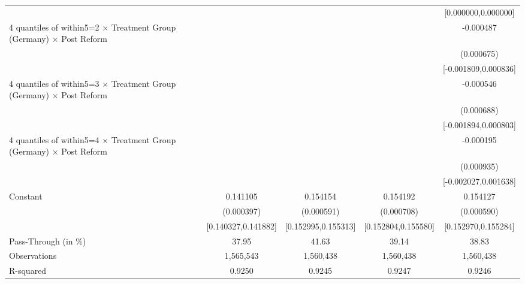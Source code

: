 {\begin{tabular}{l*{4}{c}}
                    &                     &                     &                     &[0.000000,0.000000]         \\
4 quantiles of within5=2 $\times$ Treatment Group (Germany) $\times$ Post Reform&                     &                     &                     &   -0.000487         \\
                    &                     &                     &                     &  (0.000675)         \\
                    &                     &                     &                     &[-0.001809,0.000836]         \\
4 quantiles of within5=3 $\times$ Treatment Group (Germany) $\times$ Post Reform&                     &                     &                     &   -0.000546         \\
                    &                     &                     &                     &  (0.000688)         \\
                    &                     &                     &                     &[-0.001894,0.000803]         \\
4 quantiles of within5=4 $\times$ Treatment Group (Germany) $\times$ Post Reform&                     &                     &                     &   -0.000195         \\
                    &                     &                     &                     &  (0.000935)         \\
                    &                     &                     &                     &[-0.002027,0.001638]         \\
Constant            &    0.141105\sym{***}&    0.154154\sym{***}&    0.154192\sym{***}&    0.154127\sym{***}\\
                    &  (0.000397)         &  (0.000591)         &  (0.000708)         &  (0.000590)         \\
                    &[0.140327,0.141882]         &[0.152995,0.155313]         &[0.152804,0.155580]         &[0.152970,0.155284]         \\
\midrule
Pass-Through (in \%)&       37.95         &       41.63         &       39.14         &       38.83         \\
Observations        &   1,565,543         &   1,560,438         &   1,560,438         &   1,560,438         \\
R-squared           &      0.9250         &      0.9245         &      0.9247         &      0.9246         \\
\bottomrule
\end{tabular}
}
